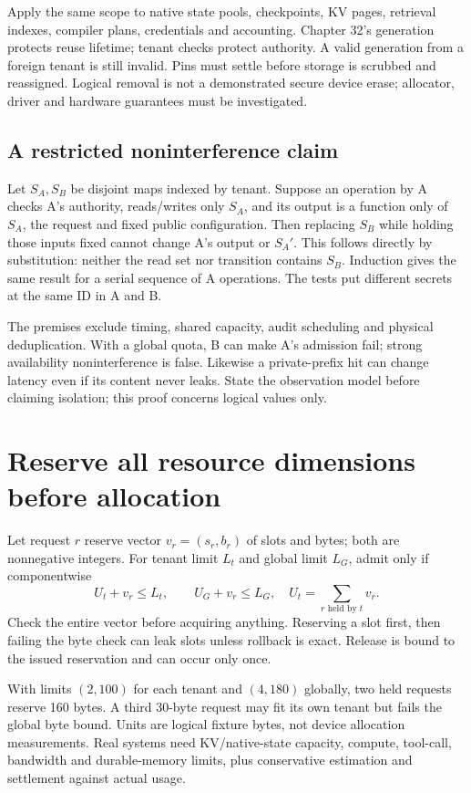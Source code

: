 Apply the same scope to native state pools, checkpoints, KV pages, retrieval
indexes, compiler plans, credentials and accounting. Chapter 32's generation
protects reuse lifetime; tenant checks protect authority. A valid generation
from a foreign tenant is still invalid. Pins must settle before storage is
scrubbed and reassigned. Logical removal is not a demonstrated secure device
erase; allocator, driver and hardware guarantees must be investigated.

\subsection{A restricted noninterference claim}
Let $S_A,S_B$ be disjoint maps indexed by tenant. Suppose an operation by A
checks A's authority, reads/writes only $S_A$, and its output is a function
only of $S_A$, the request and fixed public configuration. Then replacing
$S_B$ while holding those inputs fixed cannot change A's output or $S_A'$.
This follows directly by substitution: neither the read set nor transition
contains $S_B$. Induction gives the same result for a serial sequence of A
operations. The tests put different secrets at the same ID in A and B.

The premises exclude timing, shared capacity, audit scheduling and physical
deduplication. With a global quota, B can make A's admission fail; strong
availability noninterference is false. Likewise a private-prefix hit can
change latency even if its content never leaks. State the observation model
before claiming isolation; this proof concerns logical values only.

\section{Reserve all resource dimensions before allocation}
\label{evod45:quota}
Let request $r$ reserve vector $v_r=(s_r,b_r)$ of slots and bytes; both are
nonnegative integers. For tenant limit $L_t$ and global limit $L_G$, admit only
if componentwise
\[
 U_t+v_r\le L_t,\qquad U_G+v_r\le L_G,
 \quad U_t=\sum_{r\text{ held by }t}v_r.
\]
Check the entire vector before acquiring anything. Reserving a slot first,
then failing the byte check can leak slots unless rollback is exact.
Release is bound to the issued reservation and can occur only once.

\begin{center}\end{center}
With limits $(2,100)$ for each tenant and $(4,180)$ globally, two held
requests reserve 160 bytes. A third 30-byte request may fit its own tenant
but fails the global byte bound. Units are logical fixture bytes, not device
allocation measurements. Real systems need KV/native-state capacity, compute,
tool-call, bandwidth and durable-memory limits, plus conservative estimation
and settlement against actual usage.

